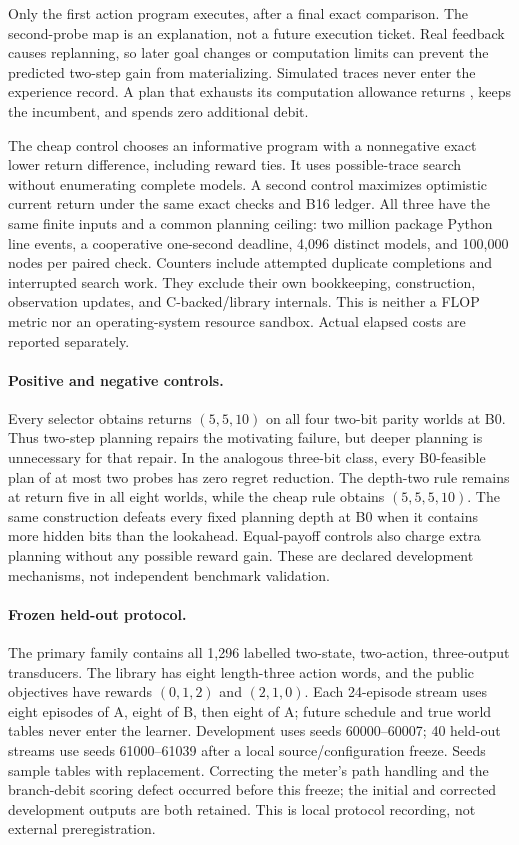 Only the first action program executes, after a final exact comparison. The
second-probe map is an explanation, not a future execution ticket. Real feedback
causes replanning, so later goal changes or computation limits can prevent the
predicted two-step gain from materializing. Simulated traces never enter the
experience record. A plan that exhausts its computation allowance returns
\unk, keeps the incumbent, and spends zero additional debit.

The cheap control chooses an informative program with a nonnegative exact lower
return difference, including reward ties. It uses possible-trace search without
enumerating complete models. A second control maximizes optimistic current
return under the same exact checks and B16 ledger. All three have the same finite
inputs and a common planning ceiling: two million package Python line events,
a cooperative one-second deadline, 4,096 distinct models, and 100,000 nodes per
paired check. Counters include attempted duplicate completions and interrupted
search work. They exclude their own bookkeeping, construction, observation
updates, and C-backed/library internals. This is neither a FLOP metric nor an
operating-system resource sandbox. Actual elapsed costs are reported separately.

\paragraph{Positive and negative controls.}
Every selector obtains returns $(5,5,10)$ on all four two-bit parity worlds at
B0. Thus two-step planning repairs the motivating failure, but deeper planning
is unnecessary for that repair. In the analogous three-bit class, every B0-feasible plan of at most two
probes has zero regret reduction. The depth-two rule remains at return
five in all eight worlds, while the cheap rule obtains $(5,5,5,10)$. The same
construction defeats every fixed planning depth at B0 when it contains more
hidden bits than the lookahead. Equal-payoff controls also charge extra planning
without any possible reward gain. These are declared development mechanisms,
not independent benchmark validation.

\paragraph{Frozen held-out protocol.}
The primary family contains all 1,296 labelled two-state, two-action,
three-output transducers. The library has eight length-three action words, and
the public objectives have rewards $(0,1,2)$ and $(2,1,0)$. Each 24-episode stream
uses eight episodes of A, eight of B, then eight of A; future schedule and true
world tables never enter the learner. Development uses seeds 60000--60007;
40 held-out streams use seeds 61000--61039 after a local source/configuration
freeze. Seeds sample tables with replacement. Correcting the meter's path
handling and the branch-debit scoring defect occurred before this freeze;
the initial and corrected development outputs are both retained. This is local
protocol recording, not external preregistration.


